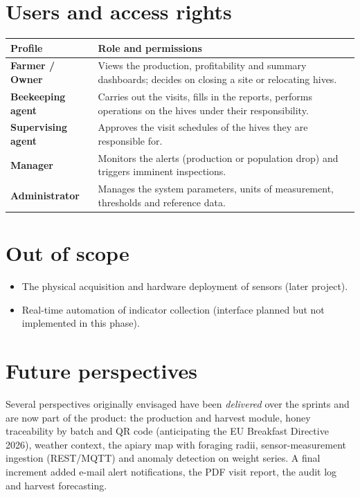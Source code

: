 \section{Users and access rights}
\begin{xltabular}{\textwidth}{>{\bfseries}p{3.2cm} X}
\toprule
\textbf{Profile} & \textbf{Role and permissions} \\
\midrule
\endhead
Farmer / Owner & Views the production, profitability and summary dashboards; decides on closing a site or relocating hives. \\
Beekeeping agent & Carries out the visits, fills in the reports, performs operations on the hives under their responsibility. \\
Supervising agent & Approves the visit schedules of the hives they are responsible for. \\
Manager & Monitors the alerts (production or population drop) and triggers imminent inspections. \\
Administrator & Manages the system parameters, units of measurement, thresholds and reference data. \\
\bottomrule
\end{xltabular}

\section{Out of scope}
\begin{itemize}
  \item The physical acquisition and hardware deployment of sensors (later project).
  \item Real-time automation of indicator collection (interface planned but not implemented in this phase).
\end{itemize}

\section{Future perspectives}
Several perspectives originally envisaged have been \emph{delivered} over the sprints
and are now part of the product: the production and harvest module, honey
traceability by batch and QR code (anticipating the EU Breakfast Directive 2026),
weather context, the apiary map with foraging radii, sensor-measurement ingestion
(REST/MQTT) and anomaly detection on weight series. A final increment added e-mail
alert notifications, the PDF visit report, the audit log and harvest forecasting.

